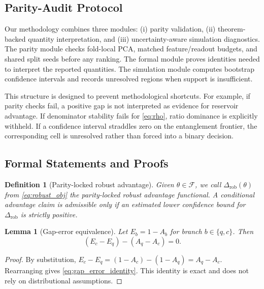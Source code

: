 \documentclass{article} %
\newtheorem{lemma}[theorem]{Lemma}
\newtheorem{definition}[theorem]{Definition}
\begin{document}
\subsection{Parity-Audit Protocol}
Our methodology combines three modules: (i) parity validation, (ii) theorem-backed quantity interpretation, and (iii) uncertainty-aware simulation diagnostics. The parity module checks fold-local PCA, matched feature/readout budgets, and shared split seeds before any ranking. The formal module proves identities needed to interpret the reported quantities. The simulation module computes bootstrap confidence intervals and records unresolved regions when support is insufficient.

This structure is designed to prevent methodological shortcuts. For example, if parity checks fail, a positive gap is not interpreted as evidence for reservoir advantage. If denominator stability fails for \eqref{eq:rho}, ratio dominance is explicitly withheld. If a confidence interval straddles zero on the entanglement frontier, the corresponding cell is unresolved rather than forced into a binary decision.

\subsection{Formal Statements and Proofs}
\begin{definition}[Parity-locked robust advantage]
\label{def:delta_rob}
Given $\theta\in\mathcal{F}$, we call $\Delta_{\mathrm{rob}}(\theta)$ from \eqref{eq:robust_obj} the parity-locked robust advantage functional. A conditional advantage claim is admissible only if an estimated lower confidence bound for $\Delta_{\mathrm{rob}}$ is strictly positive.
\end{definition}

\begin{lemma}[Gap-error equivalence]
\label{lem:gap_error}
Let $E_b=1-A_b$ for branch $b\in\{q,c\}$. Then
\begin{equation}
\label{eq:gap_error_identity}
(E_c-E_q)-(A_q-A_c)=0.
\end{equation}
\end{lemma}
\begin{proof}
By substitution, $E_c-E_q=(1-A_c)-(1-A_q)=A_q-A_c$. Rearranging gives \eqref{eq:gap_error_identity}. This identity is exact and does not rely on distributional assumptions.
\end{proof}
\end{document}

